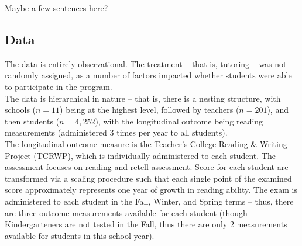 \documentclass[a0,landscape]{a0poster}
\begin{document}
\begin{multicols}{3}
Maybe a few sentences here?


\subsection*{Data}

The data is entirely observational. The treatment -- that is, tutoring -- was not randomly assigned, as a number of factors impacted whether students were able to participate in the program. \\

The data is hierarchical in nature -- that is, there is a nesting structure, with schools ($n=11$) being at the highest level, followed by teachers ($n=201$), and then students ($n=4,252$), with the longitudinal outcome being reading measurements (administered 3 times per year to all students). \\

The longitudinal outcome measure is the Teacher's College Reading \& Writing Project (TCRWP), which is individually administered to each student. The assessment focuses on reading and retell assessment. Score for each student are transformed via a scaling procedure such that each single point of the examined score approximately represents one year of growth in reading ability. The exam is administered to each student in the Fall, Winter, and Spring terms -- thus, there are three outcome measurements available for each student (though Kindergarteners are not tested in the Fall, thus there are only 2 measurements available for students in this school year). \\


\end{multicols}
\end{document}
